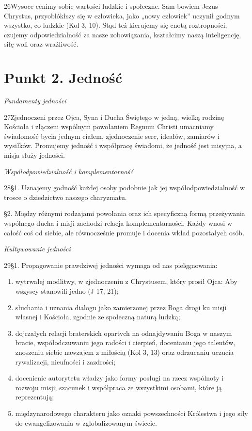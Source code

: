 ﻿\documentclass{book}
\newcommand{\lett}[1]{\lettrine[findent=6pt]{#1}}
\newcommand{\ssec}[1]{\vspace{1em}\textit{#1}\vspace{.5em}\nopagebreak}
\begin{document}
\lett{26} Wysoce cenimy sobie wartości ludzkie i społeczne. Sam bowiem Jezus Chrystus, przyoblókłszy się w człowieka, jako „nowy człowiek” uczynił godnym wszystko, co ludzkie (Kol 3, 10). Stąd też kierujemy się cnotą roztropności, czujemy odpowiedzialność za nasze zobowiązania, kształcimy naszą inteligencję, siłę woli oraz wrażliwość.


\section{Punkt 2. Jedność}


\ssec{Fundamenty jedności}
 
\lett{27} Zjednoczeni przez Ojca, Syna i Ducha Świętego w jedną, wielką rodzinę Kościoła i złączeni wspólnym powołaniem Regnum Christi umacniamy świadomość bycia jednym ciałem, zjednoczenie serc, ideałów, zamiarów i wysiłków. Promujemy jedność i współpracę świadomi, że jedność jest misyjna, a misja służy jedności.
 
\ssec{Współodpowiedzialność i komplementarność}
 
\lett{28} \S{}1. Uznajemy godność każdej osoby podobnie jak jej współodpowiedzialność w trosce o dziedzictwo naszego charyzmatu.


\S{}2. Między różnymi rodzajami powołania oraz ich specyficzną formą przeżywania wspólnego ducha i misji zachodzi relacja komplementarności. Każdy wnosi w całość coś od siebie, ale równocześnie promuje i  docenia wkład pozostałych osób.
 
\ssec{Kultywowanie  jedności}
 
\lett{29} \S{}1. Propagowanie prawdziwej jedności wymaga od nas pielęgnowania:


\begin{enumerate}


\item wytrwałej modlitwy, w zjednoczeniu z Chrystusem, który prosił Ojca: Aby wszyscy stanowili jedno (J 17, 21);


\item słuchania i uznania dialogu jako zamierzonej przez Boga drogi ku misji własnej i Kościoła, zgodnie ze społeczną naturą ludzką;


\item dojrzałych relacji braterskich opartych na odnajdywaniu Boga w naszym bracie, współodczuwaniu jego radości i cierpień, docenianiu jego talentów, znoszeniu siebie nawzajem z miłością (Kol 3, 13) oraz odrzucaniu uczucia rywalizacji, nieufności i zazdrości;


\item docenienie autorytetu władzy jako formy posługi na rzecz wspólnoty i rozwoju misji; szacunek i współpraca ze wszystkimi osobami, które ją reprezentują;


\item międzynarodowego charakteru jako oznaki powszechności Królestwa i jego siły do ewangelizowania w zglobalizowanym świecie.


\end{enumerate}
\end{document}
